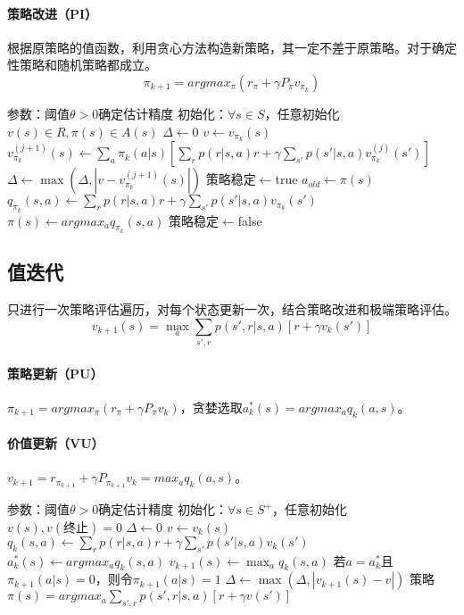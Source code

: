 \documentclass[
12pt, %
a4paper, 
oneside, %
headinclude,footinclude, %
]{scrartcl}
\begin{document}
\paragraph{策略改进（PI）}
根据原策略的值函数，利用贪心方法构造新策略，其一定不差于原策略。对于确定性策略和随机策略都成立。
$$ \pi_{k + 1} = argmax_{\pi}(r_{\pi} + \gamma P_{\pi}v_{\pi_k}) $$
\begin{myalgorithm}[策略迭代]
\State 参数：阈值$ \theta > 0 $确定估计精度
\State 初始化：$ \forall s \in S $，任意初始化$ v(s) \in R, \pi(s) \in A(s) $
\Repeat
\Repeat {}
\State $ \Delta \gets 0 $
\State $ v \gets v_{\pi_k}(s) $
\State $ v_{\pi_k}^{(j + 1)}(s) \gets \sum_a \pi_k(a|s)[\sum_r p(r|s,a)r + \gamma \sum_{s'}p(s'|s,a)v_{\pi_k}^{(j)}(s')] $
\State $ \Delta \gets \max(\Delta, |v - v_{\pi_k}^{(j+1)}(s)|) $
\EndFor
\Until{$ \Delta < \theta $}
\State 策略稳定$ \gets $true 
\State $ a_{old} \gets \pi(s) $
\State $ q_{\pi_k}(s,a) \gets \sum_r p(r|s,a)r + \gamma \sum_{s'} p(s'|s,a)v_{\pi_k}(s') $
\EndFor
\State $ \pi(s) \gets argmax_a q_{\pi_k}(s,a) $
\State 策略稳定$ \gets $false
\EndIf
\EndFor
{}
\end{myalgorithm}
\subsection[值迭代]{值迭代}
只进行一次策略评估遍历，对每个状态更新一次，结合策略改进和极端策略评估。
$$ v_{k + 1}(s) = \max_a \sum_{s', r} p(s', r|s, a)[r + \gamma v_k(s')] $$
\paragraph{策略更新（PU）}
$ \pi_{k + 1} = argmax_{\pi}(r_{\pi} + \gamma P_{\pi}v_k) $，贪婪选取$ a^*_k(s) = argmax_a q_k(a, s) $。
\paragraph{价值更新（VU）}
$ v_{k + 1} = r_{\pi_{k + 1}} + \gamma P_{\pi_{k + 1}}v_k = max_a q_k(a, s) $。
\begin{myalgorithm}[值迭代]
\State 参数：阈值$ \theta > 0 $确定估计精度
\State 初始化：$ \forall s \in S^+ $，任意初始化$ v(s), v(\text{终止}) = 0 $
\Repeat
\State $ \Delta \gets 0 $
\State $ v \gets v_k(s) $
\State $ q_k(s, a) \gets \sum_r p(r|s, a)r + \gamma \sum_{s'} p(s'|s, a)v_k(s') $
\EndFor
\State $ a^*_k(s) \gets argmax_a q_k(s, a) $
\State $ v_{k + 1}(s) \gets \max_a q_k(s, a) $
\State 若$ a = a^*_k $且$ \pi_{k + 1}(a|s) = 0 $，则令$ \pi_{k + 1}(a|s) = 1 $
\State $ \Delta \gets \max(\Delta, |v_{k+1}(s) - v|) $
\EndFor
\Until{$ \Delta < \theta $}
\State \Return 策略 $ \pi(s) = argmax_a \sum_{s',r}p(s',r|s,a)[r + \gamma v(s')] $
\end{myalgorithm}
\end{document}
